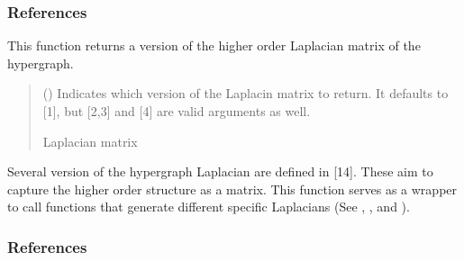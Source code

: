 \documentclass[letterpaper,10pt,english]{sphinxmanual}
\begin{document}
\begin{fulllineitems}
\begin{fulllineitems}
\subsubsection*{References}

\end{fulllineitems}


\begin{fulllineitems}
\label{\detokenize{HAT:HAT.Hypergraph.Hypergraph.laplacianMatrix}}
\pysigstartsignatures
{}
\pysigstopsignatures
\sphinxAtStartPar
This function returns a version of the higher order Laplacian matrix of the hypergraph.
\begin{quote}\begin{description}
\sphinxAtStartPar
{} (\sphinxstyleliteralemphasis{\sphinxupquote{, }}) \textendash{} Indicates which version of the Laplacin matrix to return. It defaults to  {[}1{]}, but  {[}2,3{]} and  {[}4{]} are valid arguments as well.

\sphinxAtStartPar
Laplacian matrix

\sphinxAtStartPar
{}

\end{description}\end{quote}

\sphinxAtStartPar
Several version of the hypergraph Laplacian are defined in {[}1\sphinxhyphen{}4{]}. These aim to capture
the higher order structure as a matrix. This function serves as a wrapper to call functions
that generate different specific Laplacians (See , ,
and ).
\subsubsection*{References}


\end{fulllineitems}
\end{fulllineitems}
\end{document}
